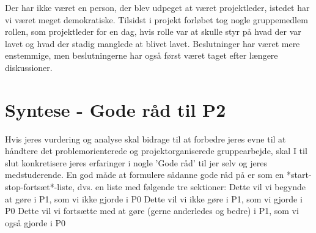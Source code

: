 \documentclass[a4paper,12pt,twoside,openright]{memoir}
\begin{document}
        Der har ikke været en person, der blev udpeget at været projektleder, istedet har vi været meget demokratiske. Tilsidst i projekt forløbet tog nogle gruppemedlem rollen, som projektleder for en dag, hvis rolle var at skulle styr på hvad der var lavet og hvad der stadig manglede at blivet lavet. Beslutninger har været mere enstemmige, men beslutningerne har også først været taget efter længere diskussioner.

    \section{Syntese - Gode råd til P2}
    Hvis jeres vurdering og analyse skal bidrage til at forbedre jeres evne til at håndtere det 
    problemorienterede og projektorganiserede gruppearbejde, skal I til slut konkretisere jeres 
    erfaringer i nogle ’Gode råd’ til jer selv og jeres medstuderende. En god måde at formulere sådanne 
    gode råd på er som en *start-stop-fortsæt*-liste, dvs. en liste med følgende tre sektioner: 
    Dette vil vi begynde at gøre i P1, som vi ikke gjorde i P0 
    Dette vil vi ikke gøre i P1, som vi gjorde i P0 
    Dette vil vi fortsætte med at gøre (gerne anderledes og bedre) i P1, som vi også gjorde i P0 
\end{document}
